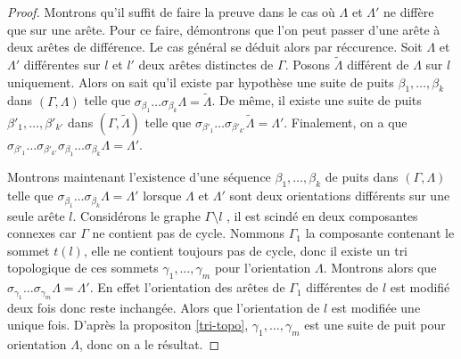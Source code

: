 \documentclass[a4paper,10pt]{article}
\begin{document}
\begin{proof}
  Montrons qu'il suffit de faire la preuve dans le cas où $\Lambda$ et $\Lambda'$ ne diffère que sur une arête. Pour ce faire, démontrons que l'on peut passer d'une arête à deux arêtes de différence. Le cas général se déduit alors par réccurence. 
Soit $\Lambda$ et $\Lambda'$ différentes sur $l$ et $l'$ deux arêtes distinctes de $\Gamma$. Posons $\widetilde \Lambda$ différent de $\Lambda$ sur $l$ uniquement. Alors on sait qu'il existe par hypothèse une suite de puits $\beta_{1}, \dots, \beta_{k}$ dans $( \Gamma, \Lambda)$ telle que $\sigma_{\beta_{1}}\dots\sigma_{\beta_{k}}\Lambda = \widetilde \Lambda$. De même, il existe une suite de puits $\beta'_{1}, \dots, \beta'_{k'}$ dans $(\Gamma,\widetilde \Lambda)$ telle que $\sigma_{\beta'_{1}}\dots\sigma_{\beta'_{k'}} \widetilde \Lambda = \Lambda'$. Finalement, on a que $\sigma_{\beta'_{1}}\dots\sigma_{\beta'_{k'}}\sigma_{\beta_{1}}\dots\sigma_{\beta_{k}}\Lambda =  \Lambda'$. 

Montrons maintenant l'existence d'une séquence $\beta_{1}, \dots, \beta_{k}$ de puits dans $(\Gamma,\Lambda)$ telle que $\sigma_{\beta_{1}}\dots\sigma_{\beta_{k}}\Lambda = \Lambda'$ lorsque $\Lambda$ et $\Lambda'$ sont deux orientations différents sur une seule arête $l$. Considérons le graphe $\Gamma \setminus l $ , il est scindé en deux composantes connexes car $\Gamma$ ne contient pas de cycle. Nommons $\Gamma_{1}$ la composante contenant le sommet $t(l)$, elle ne contient toujours pas de cycle, donc il existe un tri topologique de ces sommets $\gamma_{1}, \dots, \gamma_{m}$ pour l'orientation $\Lambda$. Montrons alors que $\sigma_{\gamma_{1}}\dots\sigma_{\gamma_{m}} \Lambda = \Lambda'$. En effet l'orientation des arêtes de $\Gamma_{1}$ différentes de $l$ est modifié deux fois donc reste inchangée. Alors que l'orientation de $l$ est modifiée une unique fois. D'après la propositon \ref{tri-topo}, $\gamma_{1}, \dots, \gamma_{m}$ est une suite de puit pour orientation $\Lambda$, donc on a le résultat.


\end{proof}
\end{document}
